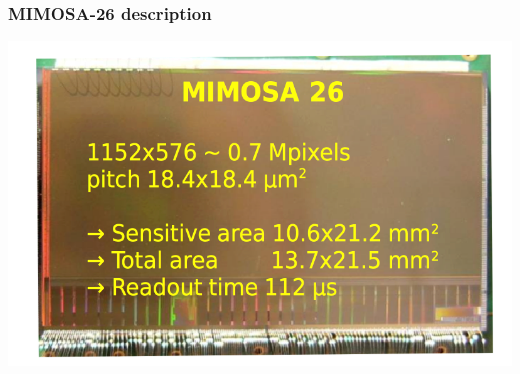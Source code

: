\documentclass{beamer}
\begin{document}
\begin{frame}[plain]
\begin{columns}[t]
  \end{columns}

\end{frame}


  \begin{frame}[plain]
    \frametitle{MIMOSA-26 description}

    \begin{center}
      \includegraphics[width = \textwidth]{Pictures/mimosa26_shortDescription.png}
    \end{center}
  \end{frame}
\end{document}
